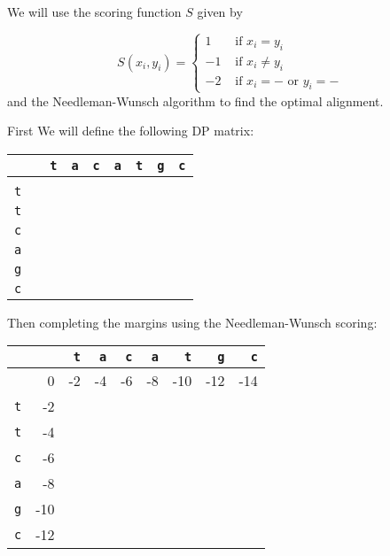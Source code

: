 \documentclass{article}
\numberwithin{equation}{section}
\begin{document}
We will use the scoring function $S$ given by

\[
S(x_i,y_i)=\left\{
\begin{array}{ll}
1 & \mbox{ if } x_i=y_i \\
-1 & \mbox{ if } x_i\neq y_i \\
-2 & \mbox{ if } x_i=- \mbox{ or } y_i=-
\end{array}
\right.
\]
and the Needleman-Wunsch algorithm to find the optimal alignment. 

First We will define the following DP matrix:

\begin{center}
\begin{tabular}{|c|rrrrrrrr|}\hline
              &      &{\tt t}    &{\tt a}      &{\tt c} &{\tt a}     &{\tt t}     &{\tt g} &{\tt c}\\ \hline%
               & & & & & & &  &\\
 \texttt{t} & & & & & & & &\\
 \texttt{t} & & & & & & & &\\
 \texttt{c} & & & & & & & &\\
 \texttt{a} & & & & & & &  &\\
 \texttt{g} & & & & & & &  &\\
 \texttt{c} & & & & & & &   &\\\hline
 \end{tabular}
\end{center}

Then completing the margins using the Needleman-Wunsch scoring: 

\begin{center}
\begin{tabular}{|c|rrrrrrrr|}\hline
              &      &{\tt t}    &{\tt a}      &{\tt c} &{\tt a}     &{\tt t}     &{\tt g} &{\tt c}\\ \hline%
               & 0   & -2        &-4          & -6         &-8          & -10  & -12 & -14\\
 \texttt{t} & -2 &  & & & & & & \\
 \texttt{t} & -4 & & & & & & & \\
 \texttt{c} & -6 & & & & & & & \\
 \texttt{a} & -8 & & & & & &  & \\
 \texttt{g} & -10 & & & & & &  &\\
 \texttt{c} & -12 & & & & & &   & \\\hline
 \end{tabular}
 \end{center}
\end{document}
